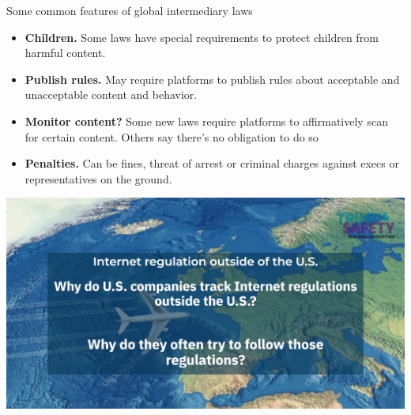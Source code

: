 \documentclass[nobackground,dvipsnames,table]{beamer}
\begin{document}
\begin{frame}{Some common features of global intermediary laws}

\begin{itemize}
    \item \textbf{Children.} Some laws  have special requirements to protect children from harmful content. 
    \item \textbf{Publish rules.} May require platforms to publish rules about acceptable and unacceptable content and behavior.
    \item \textbf{Monitor content?} Some new laws require platforms to affirmatively scan for certain content. Others say there’s no obligation to do so 
    \item \textbf{Penalties.} Can be fines, threat of arrest or criminal charges against execs or representatives on the ground.
\end{itemize}

\end{frame}


\begin{frame}{}
\includegraphics[width = \textwidth]{img/plane_picture.jpg}

\end{frame}
\end{document}
